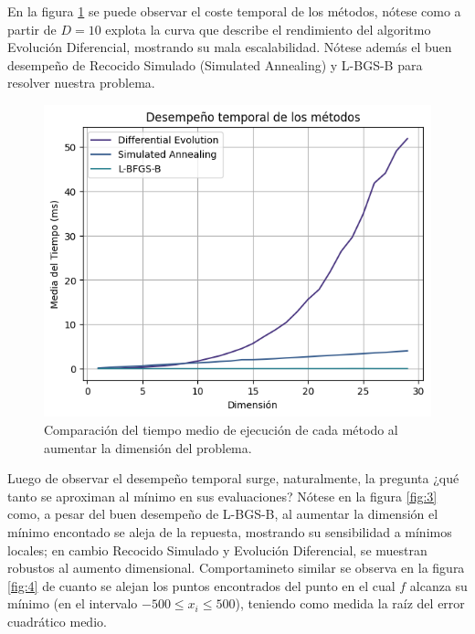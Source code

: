 \documentclass[10pt,a4paper,twocolumn]{article}
\begin{document}
		En la figura \ref{fig:2} se puede observar el coste temporal de los métodos, nótese como a partir de $D=10$ explota la curva que describe el rendimiento del algoritmo Evolución Diferencial, mostrando su mala escalabilidad. Nótese además el buen desempeño de Recocido Simulado (Simulated Annealing) y L-BGS-B para resolver nuestra problema.
			
		\begin{figure}[htb!]
			\centering
			\includegraphics[height = .75\linewidth, width=.75\linewidth]{assets/time_comp}
			\caption{Comparación del tiempo medio de ejecución de cada método al aumentar la dimensión del problema.}
			\label{fig:2}
		\end{figure}
		
		Luego de observar el desempeño temporal surge, naturalmente, la pregunta ¿qué tanto se aproximan al mínimo en sus evaluaciones? Nótese en la figura \ref{fig:3} como, a pesar del buen desempeño de L-BGS-B, al aumentar la dimensión el mínimo encontado se aleja de la repuesta, mostrando su sensibilidad a mínimos locales; en cambio Recocido Simulado y Evolución Diferencial, se muestran robustos al aumento dimensional. Comportamineto similar se observa en la figura \ref{fig:4} de cuanto se alejan los puntos encontrados del punto en el cual $f$ alcanza su mínimo (en el intervalo $-500 \leq x_i \leq 500$), teniendo como medida la raíz del error cuadrático medio.
		
\end{document}
